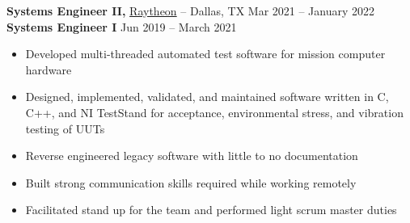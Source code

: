 \documentclass[11pt]{article}       %
\begin{document}
\textbf{Systems Engineer II,} \href{https://www.rtx.com/}{Raytheon} -- Dallas, TX \hfill Mar 2021 -- January 2022 \\
\textbf{Systems Engineer I} \hfill Jun 2019 -- March 2021 \\
\vspace{-9pt}
\begin{itemize}
  \item Developed multi-threaded automated test software for mission computer hardware
  \item Designed, implemented, validated, and maintained software written in C, C++, and NI TestStand for acceptance, environmental stress, and vibration testing of UUTs
  \item Reverse engineered legacy software with little to no documentation
  \item Built strong communication skills required while working remotely
  \item Facilitated stand up for the team and performed light scrum master duties
\end{itemize}



\end{document}

